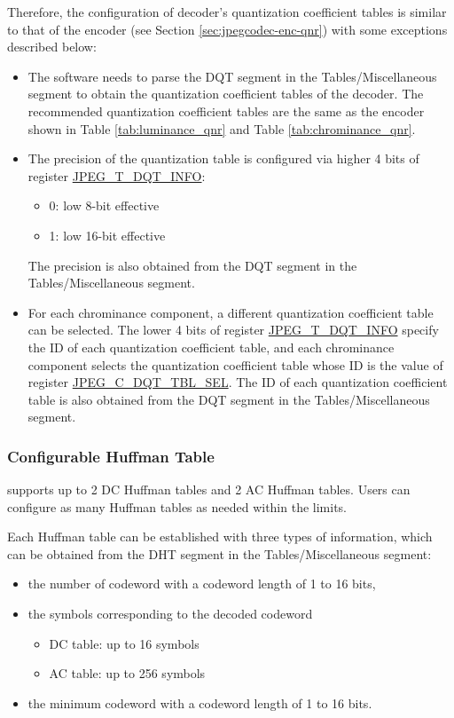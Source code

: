 \documentclass[main\_\_EN.tex]{subfiles}
\begin{document}
Therefore, the configuration of decoder's quantization coefficient tables is similar to that of the encoder (see Section \ref{sec:jpegcodec-enc-qnr}) with some exceptions described below:
\begin{itemize}
    \item The software needs to parse the DQT segment in the Tables/Miscellaneous segment to obtain the quantization coefficient tables of the decoder. The recommended quantization coefficient tables are the same as the encoder shown in Table \ref{tab:luminance_qnr} and Table \ref{tab:chrominance_qnr}.
    \item The precision of the quantization table is configured via higher 4 bits of register \hyperref[regdesc:JPEGDQTINFOREG]{JPEG\_T\_DQT\_INFO}:
    \begin{itemize}
        \item 0: low 8-bit effective
        \item 1: low 16-bit effective
    \end{itemize}
    The precision is also obtained from the DQT segment in the Tables/Miscellaneous segment.
    \item For each chrominance component, a different quantization coefficient table can be selected. The lower 4 bits of register \hyperref[regdesc:JPEGDQTINFOREG]{JPEG\_T\_DQT\_INFO} specify the ID of each quantization coefficient table, and each chrominance component selects the quantization coefficient table whose ID is the value of register \hyperref[fielddesc:JPEGC0DQTTBLSEL]{JPEG\_C\_DQT\_TBL\_SEL}. The ID of each quantization coefficient table is also obtained from the DQT segment in the Tables/Miscellaneous segment.
\end{itemize}

\subsubsection{Configurable Huffman Table}
\label{sec:jpegcodec-dec-huffman}

\chipname{} supports up to 2 DC Huffman tables and 2 AC Huffman tables. Users can configure as many Huffman tables as needed within the limits.

Each Huffman table can be established with three types of information, which can be obtained from the DHT segment in the Tables/Miscellaneous segment:
\begin{itemize}
    \item the number of codeword with a codeword length of 1 to 16 bits,
    \item the symbols corresponding to the decoded codeword
    \begin{itemize}
        \item DC table: up to 16 symbols
        \item AC table: up to 256 symbols
    \end{itemize}
    \item the minimum codeword with a codeword length of 1 to 16 bits.
\end{itemize}
\end{document}
